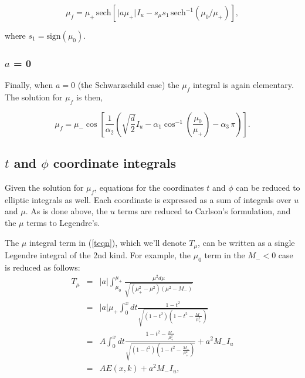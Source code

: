 \documentclass[apj]{emulateapj}
\begin{document}
\begin{equation}
 \mu_f = \mu_+\hspace{2pt} \mathrm{sech} \left [\hspace{1pt} \vert a \mu_+ \vert \hspace{1pt}I_u - s_\mu s_1 \hspace{2pt} \mathrm{sech}^{-1} (\mu_0 / \mu_+)\right],
\end{equation}

\noindent where $s_1 = \mathrm{sign}(\mu_0)$.

\subsubsection{$a$ = 0}

Finally, when $a=0$ (the Schwarzschild case) the $\mu_f$ integral is again elementary. The solution for $\mu_f$ is then,

\begin{equation}
\mu_f = \mu_- \cos{ \left [ \frac{1}{\alpha_2} \left ( \sqrt{\frac{d}{2}}I_u - \alpha_1 \cos^{-1} {\left(\frac{\mu_0}{\mu_+}\right)} - \alpha_3 \hspace{2pt} \pi \right)\right]}.
\end{equation}

\subsection{$t$ and $\phi$ coordinate integrals}

Given the solution for $\mu_f$, equations for the coordinates $t$ and $\phi$ can be reduced to elliptic integrals as well. Each coordinate is expressed as a sum of integrals over $u$ and $\mu$. As is done above, the $u$ terms are reduced to Carlson's formulation, and the $\mu$ terms to Legendre's.

The $\mu$ integral term in (\ref{teqn}), which we'll denote $T_\mu$, can be written as a single Legendre integral of the 2nd kind. For example, the $\mu_0$ term in the $M_- < 0$ case is reduced as follows:
\begin{eqnarray}
T_\mu &=& \vert a \vert \int_{\mu_0}^{\mu_+} \frac{\mu^2 d\mu}{\sqrt{(\mu_+^2-\mu^2)(\mu^2-M_-)}} \nonumber\\
      &=& \vert a \vert \mu_+ \int_0^x dt \frac{1-t^2}{\sqrt{(1-t^2)(1-t^2-\frac{M_-}{\mu_+^2})}} \nonumber\\
      &=& A \int_0^x dt \frac{1-t^2-\frac{M_-}{\mu_+^2}}{\sqrt{(1-t^2)(1-t^2-\frac{M_-}{\mu_+^2})}}\nonumber + a^2 M_- I_u \\
      &=& A E(x,k) + a^2 M_- I_u,
\end{eqnarray}
\end{document}
